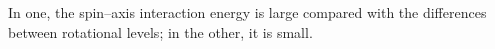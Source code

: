 In one, the spin--axis interaction energy is large compared with the differences between rotational levels; in the other, it is small.

